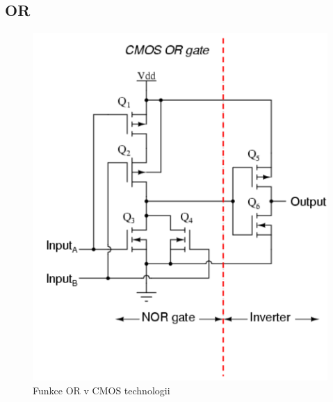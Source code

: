 \subsection{OR}

   \begin{figure}[h]
   \begin{center}
     \includegraphics[scale=0.6]{images/ORCMOS.png}
   \end{center}
   \caption{Funkce OR v CMOS technologii}
  \end{figure}